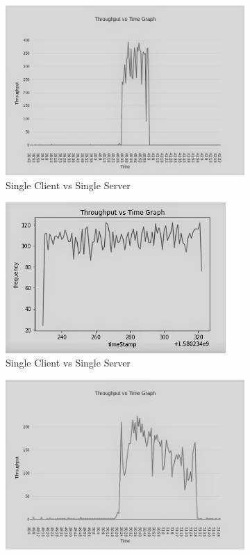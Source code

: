 \documentclass[11pt]{article}
\begin{document}
\begin{figure}[H]
    \centering 
    \begin{subfigure}{0.40\textwidth}
      \includegraphics[width=\linewidth]{1-1}
      \caption{Single Client vs Single Server}
      \label{fig:1}
    \end{subfigure}
    \hfil
    \begin{subfigure}{0.40\textwidth}
      \includegraphics[width=\linewidth]{2-1}
      \caption{Single Client vs Single Server}
      \label{fig:4}
    \end{subfigure}
    \medskip
    \begin{subfigure}{0.40\textwidth}
      \includegraphics[width=\linewidth]{1-2}

\end{subfigure}
\end{figure}
\end{document}
